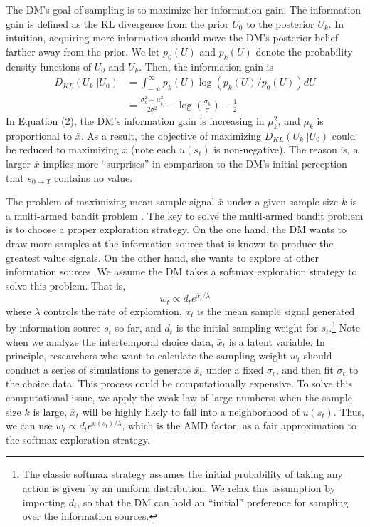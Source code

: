 \documentclass[
  12pt,
]{article}
\begin{document}
The DM's goal of sampling is to maximize her information gain. The
information gain is defined as the KL divergence from the prior \(U_0\)
to the posterior \(U_k\). In intuition, acquiring more information
should move the DM's posterior belief farther away from the prior. We
let \(p_0(U)\) and \(p_k(U)\) denote the probability density functions
of \(U_0\) and \(U_k\). Then, the information gain is\[\tag{2}
\begin{aligned}
D_{KL}(U_k||U_0)&=\int_{-\infty}^{\infty} p_k(U) \log\left(p_k(U)/p_0(U)\right)dU \\
&=\frac{\sigma_k^2+\mu_k^2}{2\sigma^2} - \log\left(\frac{\sigma_k}{\sigma}\right)-\frac{1}{2}
\end{aligned}
\]In Equation (2), the DM's information gain is increasing in
\(\mu_k^2\), and \(\mu_k\) is proportional to \(\bar{x}\). As a result,
the objective of maximizing \(D_{KL}(U_k||U_0)\) could be reduced to
maximizing \(\bar{x}\) (note each \(u(s_t)\) is non-negative). The
reason is, a larger \(\bar{x}\) implies more ``surprises'' in comparison
to the DM's initial perception that \(s_{0\rightarrow T}\) contains no
value.

The problem of maximizing mean sample signal \(\bar{x}\) under a given
sample size \(k\) is a multi-armed bandit problem
\citep[][Ch.2]{sutton2018reinforcement}. The key to solve the
multi-armed bandit problem is to choose a proper exploration strategy.
On the one hand, the DM wants to draw more samples at the information
source that is known to produce the greatest value signals. On the other
hand, she wants to explore at other information sources. We assume the
DM takes a softmax exploration strategy to solve this problem. That
is,\[
w_t \propto d_t e^{\bar{x}_t/\lambda}
\]where \(\lambda\) controls the rate of exploration, \(\bar{x}_t\) is
the mean sample signal generated by information source \(s_t\) so far,
and \(d_t\) is the initial sampling weight for \(s_t\).\footnote{The
  classic softmax strategy assumes the initial probability of taking any
  action is given by an uniform distribution. We relax this assumption
  by importing \(d_t\), so that the DM can hold an ``initial''
  preference for sampling over the information sources.} Note when we
analyze the intertemporal choice data, \(\bar{x}_t\) is a latent
variable. In principle, researchers who want to calculate the sampling
weight \(w_t\) should conduct a series of simulations to generate
\(\bar{x}_t\) under a fixed \(\sigma_\epsilon\), and then fit
\(\sigma_\epsilon\) to the choice data. This process could be
computationally expensive. To solve this computational issue, we apply
the weak law of large numbers: when the sample size \(k\) is large,
\(\bar{x}_t\) will be highly likely to fall into a neighborhood of
\(u(s_t)\). Thus, we can use \(w_t \propto d_t e^{u(s_t)/\lambda}\),
which is the AMD factor, as a fair approximation to the softmax
exploration strategy.
\end{document}
